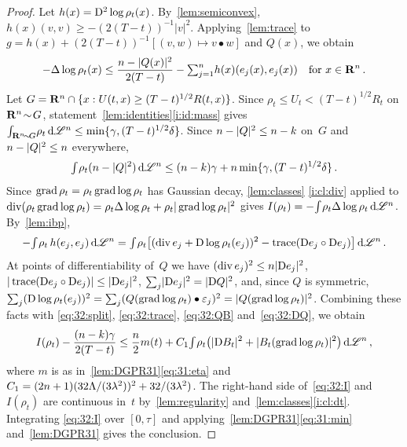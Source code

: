 \documentclass[a4paper,twoside,leqno]{article}
\begin{document}
\begin{proof}
    Let $h(x) = \mathrm{D}^2 \log \rho_t(x)$. By~\ref{lem:semiconvex}, $h(x)(v,v) \ge -(2(T-t))^{-1}
    |v|^2$. Applying~\ref{lem:trace} to $g = h(x) + (2(T-t))^{-1} [(v,w) \mapsto v \bullet w]$ and
    $Q(x)$, we obtain
    \begin{equation}
        \label{eq:32:split}
        - \Delta \log \rho_t(x) \le \frac{n - |Q(x)|^2}{2 (T-t)} - {\textstyle\sum_{j=1}^{n}}
        h(x)(e_j(x),e_j(x)) \quad \text{for $x \in \mathbf{R}^{n}$} \,.
    \end{equation}
    Let $G = \mathbf{R}^{n} \cap \{ x : U(t,x) \ge (T-t)^{1/2} R(t,x) \}$. Since $\rho_t \le U_t <
    (T-t)^{1/2} R_t$ on $\mathbf{R}^{n} \!\sim\! G$, statement~\ref{lem:identities}\ref{i:id:mass}
    gives ${\textstyle\int_{\mathbf{R}^{n} \!\sim\! G}^{}} \rho_t \,\mathrm{d} \mathscr{L}^{n} \le \min \{ \gamma,
    (T-t)^{1/2} \delta \}$. Since $n - |Q|^2 \le n - k$ on~$G$ and $n - |Q|^2 \le
    n$ everywhere,
    \begin{equation}
        \label{eq:32:trace}
        {\textstyle\int_{}^{}} \rho_t (n - |Q|^2) \,\mathrm{d} \mathscr{L}^{n} \le (n - k) \gamma + n \min
        \{ \gamma, (T-t)^{1/2} \delta \} \,.
    \end{equation}
    Since $\operatorname{grad} \rho_t = \rho_t \operatorname{grad} \log \rho_t$ has Gaussian decay, \ref{lem:classes}
    \ref{i:cl:div} applied to $\mathrm{div}(\rho_t \operatorname{grad} \log \rho_t) = \rho_t \Delta \log \rho_t +
    \rho_t |\operatorname{grad} \log \rho_t|^2$ gives $I(\rho_t) = - {\textstyle\int_{}^{}} \rho_t \Delta \log \rho_t \,\mathrm{d}
    \mathscr{L}^{n}$. By~\ref{lem:ibp},
    \begin{displaymath}
        - {\textstyle\int_{}^{}} \rho_t \, h(e_j,e_j) \,\mathrm{d} \mathscr{L}^{n} = {\textstyle\int_{}^{}} \rho_t \bigl[
        (\mathrm{div}\, e_j + \mathrm{D} \log \rho_t(e_j))^2 - \operatorname{trace}(\mathrm{D} e_j \circ \mathrm{D} e_j) \bigr] \,\mathrm{d}
        \mathscr{L}^{n} \,.
    \end{displaymath}
    At points of differentiability of~$Q$ we have $(\mathrm{div}\, e_j)^2 \le n |\mathrm{D} e_j|^2$,
    $|\operatorname{trace}(\mathrm{D} e_j \circ \mathrm{D} e_j)| \le |\mathrm{D} e_j|^2$, ${\textstyle\sum_{j}^{}} |\mathrm{D} e_j|^2 = |\mathrm{D} Q|^2$,
    and, since $Q$ is symmetric, ${\textstyle\sum_{j}^{}} (\mathrm{D} \log \rho_t(e_j))^2 = {\textstyle\sum_{j}^{}} (Q(\operatorname{grad}
    \log \rho_t) \bullet \varepsilon_j)^2 = |Q(\operatorname{grad} \log \rho_t)|^2$. Combining these facts with
    \eqref{eq:32:split}, \eqref{eq:32:trace}, \eqref{eq:32:QB} and~\eqref{eq:32:DQ}, we obtain
    \begin{equation}
        \label{eq:32:I}
        I(\rho_t) - \frac{(n - k) \gamma}{2 (T-t)} \le \frac{n}{2} m(t) + C_1
        {\textstyle\int_{}^{}} \rho_t \bigl( |\mathrm{D} B_t|^2 + |B_t(\operatorname{grad} \log \rho_t)|^2 \bigr) \,\mathrm{d}
        \mathscr{L}^{n} \,,
    \end{equation}
    where $m$ is as in~\ref{lem:DGPR31}\eqref{eq:31:eta} and $C_1 = (2 n + 1)(32 \Lambda / (3
    \lambda^2))^2 + 32/(3 \lambda^2)$. The right-hand side of~\eqref{eq:32:I} and $I(\rho_t)$ are
    continuous in~$t$ by~\ref{lem:regularity} and~\ref{lem:classes}\ref{i:cl:dt}. Integrating
    \eqref{eq:32:I} over $[0,\tau]$ and applying~\ref{lem:DGPR31}\eqref{eq:31:min}
    and~\ref{lem:DGPR31} gives the conclusion.
\end{proof}
\end{document}
